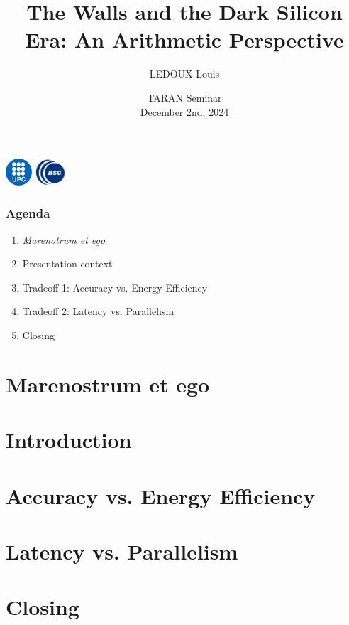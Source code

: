 \documentclass[]{beamer}
\author[TARAN Seminar]{LEDOUX Louis}
\institute[]{Universitat Politècnica de Catalunya (UPC)\\ Barcelona Supercomputing Center (BSC)
\vspace{2mm} \\
}
\title[]{The Walls and the Dark Silicon Era: An Arithmetic Perspective}
\date[December 2nd, 2024]{\small{TARAN Seminar} \\ \small{December 2nd, 2024}}
\begin{document}
\begin{frame}[plain]
	\titlepage
	\begin{center}%
		\vspace{-0.2cm}
		\includegraphics[height=1cm]{./figs/darkblue-logo.pdf}
		\hspace{2mm}
		\includegraphics[height=1cm]{./figs/bsc_logo_2.jpg}
	\end{center}
\end{frame}

\begin{frame}
\frametitle{Agenda}
	\begin{enumerate}
		\item \textit{Marenotrum et ego}
		\item Presentation context
		\item Tradeoff 1: Accuracy vs. Energy Efficiency
		\item Tradeoff 2: Latency vs. Parallelism
		\item Closing
	\end{enumerate}
\end{frame}

\section{Marenostrum et ego}


\section{Introduction}


\section{Accuracy vs. Energy Efficiency}


\section{Latency vs. Parallelism}

\section{Closing}

\appendix


 
\end{document}
